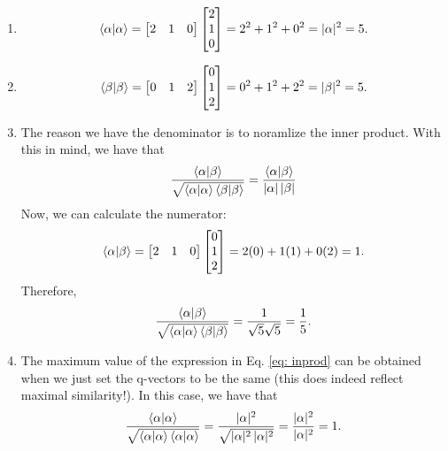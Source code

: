 \documentclass{article}
\begin{document}
\begin{enumerate}[label=\alph*)]
    \item 
    \[
    \braket{\alpha} = \begin{bmatrix}
    2 & 1 & 0
    \end{bmatrix}
    \begin{bmatrix}
    2 \\
    1 \\
    0
    \end{bmatrix}
    = 2^2 + 1^2 + 0^2= |\alpha|^2 = 5.
    \]
    \item 
    \[
    \braket{\beta} = \begin{bmatrix}
    0 & 1 & 2
    \end{bmatrix}
    \begin{bmatrix}
    0 \\
    1 \\
    2
    \end{bmatrix}
    = 0^2 + 1^2 + 2^2 = |\beta|^2 = 5.
    \]
    \item The reason we have the denominator is to noramlize the inner product. With this in mind, we have that 
    \[
    \frac{\braket{\alpha}{\beta}}{\sqrt{\braket{\alpha}\braket{\beta}}} = \frac{\braket{\alpha}{\beta}}{|\alpha| \, |\beta|}
    \]
    Now, we can calculate the numerator:
    \[
    \braket{\alpha}{\beta} = \begin{bmatrix}
    2 & 1 & 0
    \end{bmatrix}
    \begin{bmatrix}
    0 \\
    1 \\
    2
    \end{bmatrix}
    = 2(0) + 1(1) + 0(2) = 1.
    \]
    Therefore,
    \[
    \frac{\braket{\alpha}{\beta}}{\sqrt{\braket{\alpha}\braket{\beta}}} = \frac{1}{\sqrt{5} \sqrt{5}} = \frac{1}{5}.
    \]
    \item The maximum value of the expression in Eq. \ref{eq: inprod} can be obtained when we just set the q-vectors to be the same (this does indeed reflect maximal similarity!). In this case, we have that
    \[
    \frac{\braket{\alpha}{\alpha}}{\sqrt{\braket{\alpha}\braket{\alpha}}} = \frac{|\alpha|^2}{\sqrt{|\alpha|^2\,|\alpha|^2}} = \frac{|\alpha|^2}{|\alpha|^2} = 1.
    \]
\end{enumerate}

\newpage
\end{document}
